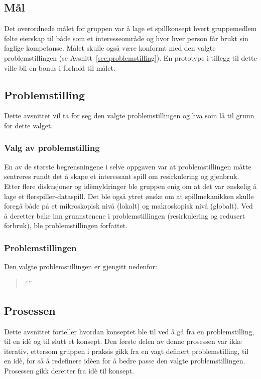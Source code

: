 \subsection{Mål}
Det overordnede målet for gruppen var å lage et spillkonsept hvert
gruppemedlem følte eierskap til både som et interesseområde og hvor hver person får brukt sin faglige kompetanse. Målet skulle også være konformt med den valgte
problemstillingen (se Avsnitt~\ref{sec:problemstilling}). En prototype i
tillegg til dette ville bli en bonus i forhold til målet.

\subsection{Problemstilling}
Dette avsnittet vil ta for seg den valgte problemstillingen og hva som
lå til grunn for dette valget.
\subsubsection{Valg av problemstilling}
En av de største begrensningene i selve oppgaven var at
problemstillingen måtte sentreres rundt det å skape et interessant spill
om resirkulering og gjenbruk. Etter flere diskusjoner og idèmyldringer ble gruppen
enig om at det var ønskelig å lage et flerspiller-dataspill.
Det ble også ytret ønske om at spillmekanikken skulle foregå både på et
mikroskopisk nivå (lokalt) og makroskopisk nivå (globalt). Ved å
deretter bake inn grunnstenene i problemstillingen (resirkulering og
redusert forbruk), ble problemstillingen forfattet.
\subsubsection{Problemstillingen}\label{sec:problemstillingen}
Den valgte problemstillingen er gjengitt nedenfor:
\begin{quotation}
\large\emph{``''}
\end{quotation}
\subsection{Prosessen}
Dette avsnittet forteller hvordan konseptet ble til ved å gå fra en
problemstilling, til en idè og til slutt et konsept. Den første delen av
denne prosessen var ikke iterativ, ettersom gruppen i praksis gikk fra
en vagt definert problemstilling, til en idè, for så å redefinere idèen
for å bedre passe den valgte problemstillingen. Prosessen gikk deretter
fra idè til konsept. 
